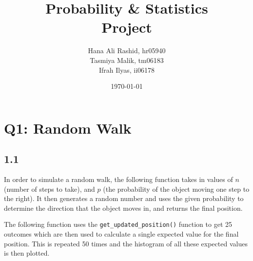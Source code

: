 \documentclass[answers]{exam}
\title{Probability \& Statistics\\ Project}
\author{Hana Ali Rashid, hr05940\\ Tasmiya Malik, tm06183\\ Ifrah Ilyas, ii06178}
\date{\today{}}
\begin{document}
\maketitle

\section*{Q1: Random Walk}
\subsection*{1.1}
In order to simulate a random walk, the following function takes in values of $n$ (number of steps to take), and $p$ (the probability of the object moving one step to the right). It then generates a random number and uses the given probability to determine the direction that the object moves in, and returns the final position.

The following function uses the \texttt{get\_updated\_position()} function to get 25 outcomes which are then used to calculate a single expected value for the final position. This is repeated 50 times and the histogram of all these expected values is then plotted.

\pagebreak
\end{document}
